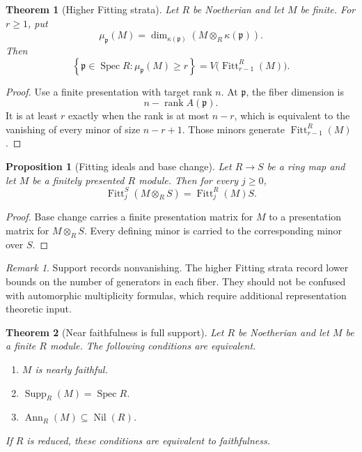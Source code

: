 \documentclass{aomart}
\newtheorem{theorem}{Theorem}[section]
\newtheorem{proposition}[proposition]{Proposition}
\theoremstyle{definition}
\theoremstyle{remark}
\newtheorem{remark}[remark]{Remark}
\newcommand{\Spec}{\operatorname{Spec}}
\newcommand{\Supp}{\operatorname{Supp}}
\newcommand{\Ann}{\operatorname{Ann}}
\newcommand{\Fitt}{\operatorname{Fitt}}
\newcommand{\rank}{\operatorname{rank}}
\newcommand{\nil}{\operatorname{Nil}}
\newcommand{\frakp}{\mathfrak p}
\begin{document}
\begin{theorem}[Higher Fitting strata]\label{thm:higher_fitting_strata}
Let \(R\) be Noetherian and let \(M\) be finite. For \(r\geq1\), put
\[
\mu_{\frakp}(M)
=
\dim_{\kappa(\frakp)}
\left(M\otimes_R\kappa(\frakp)\right).
\]
Then
\[
\boxed{
\left\{
\frakp\in\Spec R:
\mu_{\frakp}(M)\geq r
\right\}
=
V\bigl(\Fitt_{r-1}^R(M)\bigr).
}
\]
\end{theorem}

\begin{proof}
Use a finite presentation with target rank \(n\). At \(\frakp\), the fiber dimension is
\[
n-\rank A(\frakp).
\]
It is at least \(r\) exactly when the rank is at most \(n-r\), which is equivalent to the vanishing of every minor of size \(n-r+1\). Those minors generate \(\Fitt_{r-1}^R(M)\).
\end{proof}

\begin{proposition}[Fitting ideals and base change]\label{prop:fitting_base_change}
Let \(R\to S\) be a ring map and let \(M\) be a finitely presented \(R\) module. Then for every \(j\geq0\),
\[
\boxed{
\Fitt_j^S(M\otimes_RS)
=
\Fitt_j^R(M)S.
}
\]
\end{proposition}

\begin{proof}
Base change carries a finite presentation matrix for \(M\) to a presentation matrix for \(M\otimes_RS\). Every defining minor is carried to the corresponding minor over \(S\).
\end{proof}

\begin{remark}
Support records nonvanishing. The higher Fitting strata record lower bounds on the number of generators in each fiber. They should not be confused with automorphic multiplicity formulas, which require additional representation theoretic input.
\end{remark}

\begin{theorem}[Near faithfulness is full support]\label{thm:near_faithful_full_support}
Let \(R\) be Noetherian and let \(M\) be a finite \(R\) module. The following conditions are equivalent.
\begin{enumerate}
\item \(M\) is nearly faithful.
\item \(\Supp_R(M)=\Spec R\).
\item \(\Ann_R(M)\subseteq\nil(R)\).
\end{enumerate}
If \(R\) is reduced, these conditions are equivalent to faithfulness.
\end{theorem}
\end{document}
